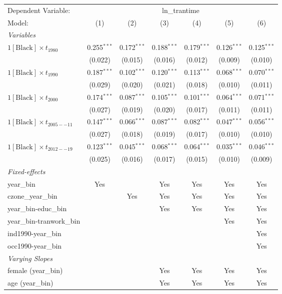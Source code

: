 \begin{tabular}{lcccccc}
\tabularnewline\midrule\midrule
Dependent Variable:&\multicolumn{6}{c}{ln\_trantime}\\
Model:&(1) & (2) & (3) & (4) & (5) & (6)\\
\midrule \emph{Variables}&   &   &   &   &   &  \\
$1[\text{Black}] \times t_{1980}$ & 0.255$^{***}$ & 0.172$^{***}$ & 0.188$^{***}$ & 0.179$^{***}$ & 0.126$^{***}$ & 0.125$^{***}$\\
  &(0.022) & (0.015) & (0.016) & (0.012) & (0.009) & (0.010)\\
$1[\text{Black}] \times t_{1990}$ & 0.187$^{***}$ & 0.102$^{***}$ & 0.120$^{***}$ & 0.113$^{***}$ & 0.068$^{***}$ & 0.070$^{***}$\\
  &(0.029) & (0.020) & (0.021) & (0.018) & (0.010) & (0.011)\\
$1[\text{Black}] \times t_{2000}$ & 0.174$^{***}$ & 0.087$^{***}$ & 0.105$^{***}$ & 0.101$^{***}$ & 0.064$^{***}$ & 0.071$^{***}$\\
  &(0.027) & (0.019) & (0.020) & (0.017) & (0.011) & (0.011)\\
$1[\text{Black}] \times t_{2005--11}$ & 0.147$^{***}$ & 0.066$^{***}$ & 0.087$^{***}$ & 0.082$^{***}$ & 0.047$^{***}$ & 0.056$^{***}$\\
  &(0.027) & (0.018) & (0.019) & (0.017) & (0.010) & (0.010)\\
$1[\text{Black}] \times t_{2012--19}$ & 0.123$^{***}$ & 0.045$^{***}$ & 0.068$^{***}$ & 0.064$^{***}$ & 0.035$^{***}$ & 0.046$^{***}$\\
  &(0.025) & (0.016) & (0.017) & (0.015) & (0.010) & (0.009)\\
\midrule \emph{Fixed-effects}&   &   &   &   &   &  \\
year\_bin & Yes &  & Yes & Yes & Yes & Yes\\
czone\_year\_bin &  & Yes & Yes & Yes & Yes & Yes\\
year\_bin-educ\_bin &  &  & Yes & Yes & Yes & Yes\\
year\_bin-tranwork\_bin &  &  &  &  & Yes & Yes\\
ind1990-year\_bin &  &  &  &  &  & Yes\\
occ1990-year\_bin &  &  &  &  &  & Yes\\
\midrule \emph{Varying Slopes}&   &   &   &   &   &  \\
female (year\_bin) &  &  & Yes & Yes & Yes & Yes\\
age (year\_bin) &  &  & Yes & Yes & Yes & Yes\\

\end{tabular}

